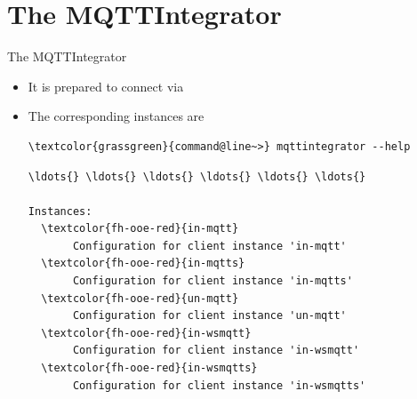 ﻿\section[withsectionpage]{The MQTTIntegrator}

\begin{frame}[fragile]{The MQTTIntegrator}
\begin{itemize}
\item It is prepared to connect via
\item The corresponding instances are
\begin{scriptsize}
\begin{Verbatim}[commandchars=\\\{\}]
\textcolor{grassgreen}{command@line~>} mqttintegrator --help
\end{Verbatim}
\begin{Verbatim}[commandchars=\\\{\},frame=leftline,rulecolor=\color{fh-ooe-red}]
\ldots{} \ldots{} \ldots{} \ldots{} \ldots{} \ldots{}

Instances:
  \textcolor{fh-ooe-red}{in-mqtt}
       Configuration for client instance 'in-mqtt'
  \textcolor{fh-ooe-red}{in-mqtts}
       Configuration for client instance 'in-mqtts'
  \textcolor{fh-ooe-red}{un-mqtt}
       Configuration for client instance 'un-mqtt'
  \textcolor{fh-ooe-red}{in-wsmqtt}
       Configuration for client instance 'in-wsmqtt'
  \textcolor{fh-ooe-red}{in-wsmqtts}
       Configuration for client instance 'in-wsmqtts'
\end{Verbatim}
\end{scriptsize}
\end{itemize}
\end{frame}

